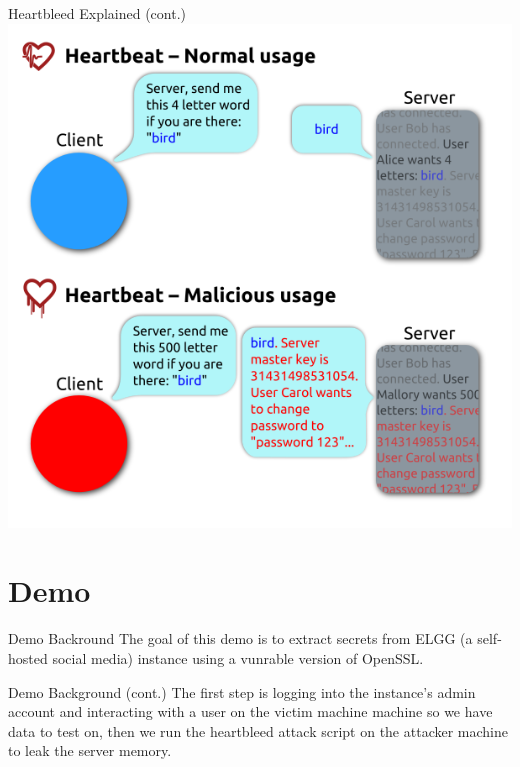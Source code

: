 \documentclass{beamer}
\begin{document}
  \begin{frame}{Heartbleed Explained (cont.)}
    \includegraphics[width=\textheight]{heartbleed_visualization.png}
  \end{frame}

  \section{Demo}
  \begin{frame}{Demo Backround}
    The goal of this demo is to extract secrets from ELGG (a self-hosted social media)
    instance using a vunrable version of OpenSSL.

  \end{frame}

  \begin{frame}{Demo Background (cont.)}
    The first step is logging into the instance's admin account and interacting with a user
    on the victim machine machine so we have data to test on, then we run the heartbleed
    attack script on the attacker machine to leak the server memory.
  \end{frame}
\end{document}
